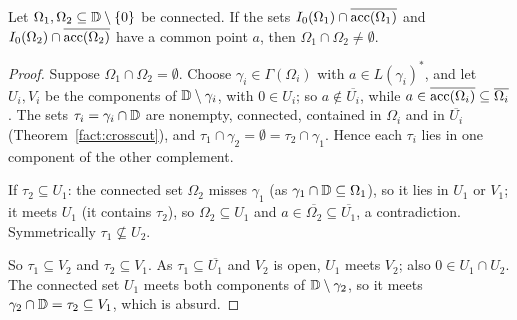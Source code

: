 \begin{lemma}\label{lem:mm-lemma3}
Let $\Omega_1,\Omega_2\subseteq\mathbb{D}\setminus\{0\}$ be connected. If the sets
$I_0(\Omega_1)\cap\overline{\operatorname{acc}(\Omega_1)}$ and $I_0(\Omega_2)\cap\overline{\operatorname{acc}(\Omega_2)}$ have a common
point $a$, then $\Omega_1\cap\Omega_2\ne\emptyset$.
\end{lemma}
\begin{proof}
Suppose $\Omega_1\cap\Omega_2=\emptyset$. Choose $\gamma_i\in\Gamma(\Omega_i)$ with $a\in L(\gamma_i)^*$, and let
$U_i,V_i$ be the components of $\mathbb{D}\setminus\gamma_i$, with $0\in U_i$; so $a\notin\overline{U_i}$, while
$a\in\overline{\operatorname{acc}(\Omega_i)}\subseteq\overline{\Omega_i}$. The sets $\tau_i=\gamma_i\cap\mathbb{D}$ are nonempty, connected,
contained in $\Omega_i$ and in $\overline{U_i}$ (Theorem~\ref{fact:crosscut}), and $\tau_1\cap\gamma_2=\emptyset=
\tau_2\cap\gamma_1$. Hence each $\tau_i$ lies in one component of the other complement.

If $\tau_2\subseteq U_1$: the connected set $\Omega_2$ misses $\gamma_1$ (as $\gamma_1\cap\mathbb{D}\subseteq\Omega_1$), so
it lies in $U_1$ or $V_1$; it meets $U_1$ (it contains $\tau_2$), so $\Omega_2\subseteq U_1$ and
$a\in\overline{\Omega_2}\subseteq\overline{U_1}$, a contradiction. Symmetrically $\tau_1\not\subseteq U_2$.

So $\tau_1\subseteq V_2$ and $\tau_2\subseteq V_1$. As $\tau_1\subseteq\overline{U_1}$ and $V_2$ is open, $U_1$ meets
$V_2$; also $0\in U_1\cap U_2$. The connected set $U_1$ meets both components of $\mathbb{D}\setminus\gamma_2$, so it meets
$\gamma_2\cap\mathbb{D}=\tau_2\subseteq V_1$, which is absurd.
\end{proof}

